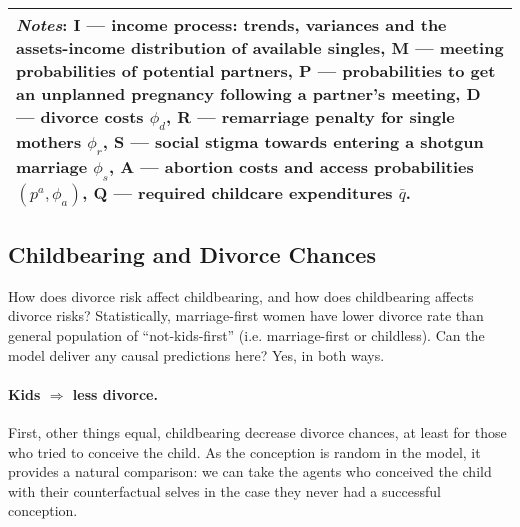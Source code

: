 \documentclass[12pt,letter]{article}
\begin{document}
\begin{table}[p]
\begin{center}
\begin{tabular}{l r r | r r r r r r r r}
\multicolumn{11}{p{0.9\linewidth}}{\textit{Notes}: \textbf{I} --- income process: trends, variances and the assets-income distribution of available singles, \textbf{M} --- meeting probabilities of potential partners, \textbf{P} --- probabilities to get an unplanned pregnancy following a partner's meeting,
\textbf{D} --- divorce costs $\phi_d$, \textbf{R} --- remarriage penalty for single mothers $\phi_r$, \textbf{S} --- social stigma towards entering a shotgun marriage $\phi_s$, \textbf{A} --- abortion costs and access probabilities $(p^a,\phi_a)$, \textbf{Q} --- required childcare expenditures $\bar{q}$.}\\
\hline
\end{tabular}
\end{center}
\end{table}

\subsection{Childbearing and Divorce Chances\label{divorce-fertility-general}}

How does divorce risk affect childbearing, and how does childbearing affects divorce risks? Statistically, marriage-first women have lower divorce rate than general population of ``not-kids-first'' (i.e. marriage-first or childless). Can the model deliver any causal predictions here? Yes, in both ways.


\paragraph{Kids $\Rightarrow$ less divorce.} First, other things equal, childbearing decrease divorce chances, at least for those who tried to conceive the child. As the conception is random in the model, it provides a natural comparison: we can take the agents who conceived the child with their counterfactual selves in the case they never had a successful conception.
\end{document}
